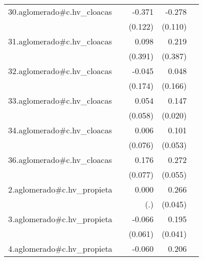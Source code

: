 {\begin{longtable}{l*{4}{D{.}{.}{-1}}}
\addlinespace
30.aglomerado#c.hv\_cloacas&                     &      -0.371\sym{**} &      -0.278\sym{*}  &                     \\
            &                     &     (0.122)         &     (0.110)         &                     \\
\addlinespace
31.aglomerado#c.hv\_cloacas&                     &       0.098         &       0.219         &                     \\
            &                     &     (0.391)         &     (0.387)         &                     \\
\addlinespace
32.aglomerado#c.hv\_cloacas&                     &      -0.045         &       0.048         &                     \\
            &                     &     (0.174)         &     (0.166)         &                     \\
\addlinespace
33.aglomerado#c.hv\_cloacas&                     &       0.054         &       0.147\sym{***}&                     \\
            &                     &     (0.058)         &     (0.020)         &                     \\
\addlinespace
34.aglomerado#c.hv\_cloacas&                     &       0.006         &       0.101         &                     \\
            &                     &     (0.076)         &     (0.053)         &                     \\
\addlinespace
36.aglomerado#c.hv\_cloacas&                     &       0.176\sym{*}  &       0.272\sym{***}&                     \\
            &                     &     (0.077)         &     (0.055)         &                     \\
\addlinespace
2.aglomerado#c.hv\_propieta&                     &       0.000         &       0.266\sym{***}&                     \\
            &                     &         (.)         &     (0.045)         &                     \\
\addlinespace
3.aglomerado#c.hv\_propieta&                     &      -0.066         &       0.195\sym{***}&                     \\
            &                     &     (0.061)         &     (0.041)         &                     \\
\addlinespace
4.aglomerado#c.hv\_propieta&                     &      -0.060         &       0.206\sym{***}&                     \\

\end{longtable}}
